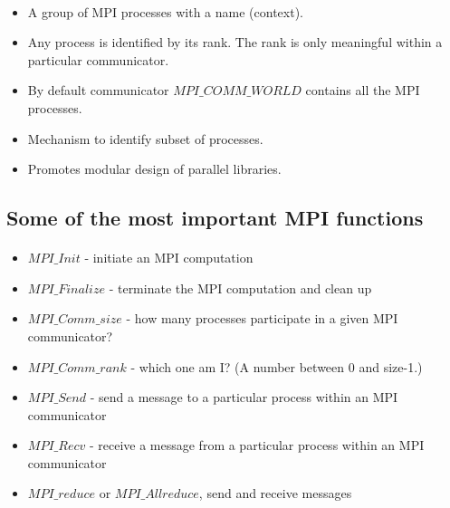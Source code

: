 \documentclass[%
twoside,                 %
final,                   %
10pt]{article}
\begin{document}
\paragraph{}
\begin{itemize}
\item A group of MPI processes with a name (context).

\item Any process is identified by its rank. The rank is only meaningful within a particular communicator.

\item By default communicator $MPI\_COMM\_WORLD$ contains all the MPI processes.

\item Mechanism to identify subset of processes.

\item Promotes modular design of parallel libraries.
\end{itemize}

\noindent




\subsection{Some of the most  important MPI functions}

\paragraph{}



\begin{itemize}
\item $MPI\_Init$ - initiate an MPI computation

\item $MPI\_Finalize$ - terminate the MPI computation and clean up

\item $MPI\_Comm\_size$ - how many processes participate in a given MPI communicator?

\item $MPI\_Comm\_rank$ - which one am I? (A number between 0 and size-1.)

\item $MPI\_Send$ - send a message to a particular process within an MPI communicator

\item $MPI\_Recv$ - receive a message from a particular process within an MPI communicator

\item $MPI\_reduce$  or $MPI\_Allreduce$, send and receive messages
\end{itemize}
\end{document}
